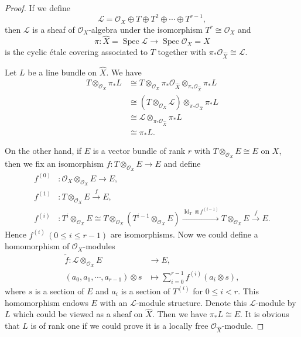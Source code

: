 \documentclass[12pt]{article}
\begin{document}
\begin{proof}
If we define
\[ \mathcal{L} = \mathcal{O}_{X} \oplus T \oplus T^{2} \oplus \cdots \oplus T^{r-1}, \]
then $\mathcal{L}$ is a sheaf of $\mathcal{O}_{X}$-algebra under the isomorphism $T^{r} \cong \mathcal{O}_{X}$ and
\[ \pi \colon \widehat{X} = \operatorname{Spec }\mathcal{L} \to \operatorname{Spec } \mathcal{O}_{X} = X \]
is the cyclic \'etale covering associated to $T$ together with $\pi_{*} \mathcal{O}_{\widehat{X}} \cong  \mathcal{L}$.

Let $L$ be a line bundle on $\widehat{X}$. We have
\begin{align*}
T \otimes_{\mathcal{O}_{X}} \pi_{*}L &\cong T \otimes_{\mathcal{O}_{X}} \pi_{*} \mathcal{O}_{\widehat{X}} \otimes_{\pi_{*} \mathcal{O}_{\widehat{X}}} \pi_{*}L \\
&\cong (T \otimes_{\mathcal{O}_{X}} \mathcal{L}) \otimes_{\pi_{*} \mathcal{O}_{\widehat{X}}} \pi_{*}L \\
&\cong \mathcal{L} \otimes_{\pi_{*} \mathcal{O}_{\widehat{X}}} \pi_{*}L \\
&\cong \pi_{*}L.
\end{align*}

On the other hand, if $E$ is a vector bundle of rank $r$ with $T \otimes_{\mathcal{O}_{X}} E \cong E$ on $X$, then we fix an isomorphism $f \colon T \otimes_{\mathcal{O}_{X}} E \to E$ and define
\begin{align*}
f^{(0)} &\colon \mathcal{O}_{X} \otimes_{\mathcal{O}_{X}} E \to E, \\
f^{(1)} &\colon T \otimes_{\mathcal{O}_{X}} E \xrightarrow{f} E, \\
f^{(i)} &\colon T^{i} \otimes_{\mathcal{O}_{X}} E \cong T \otimes_{\mathcal{O}_{X}} (T^{i-1} \otimes_{\mathcal{O}_{X}} E ) \xrightarrow{\operatorname{Id}_{T} \otimes f^{(i-1)}} T \otimes_{\mathcal{O}_{X}} E \xrightarrow{f} E.
\end{align*}
Hence $f^{(i)} \, (0 \leq i \leq r-1)$ are isomorphisms. Now we could define a homomorphism of $\mathcal{O}_{X}$-modules
\begin{align*}
\widetilde{f} \colon \mathcal{L} \otimes_{\mathcal{O}_{X}} E &\to E, \\
(a_{0}, a_{1}, \cdots, a_{r-1}) \otimes s &\mapsto \sum_{i=0}^{r-1} f^{(i)}(a_{i} \otimes s),
\end{align*}
where $s$ is a section of $E$ and $a_{i}$ is a section of $T^{(i)}$ for $0 \leq i < r$. This homomorphism endows $E$ with an $\mathcal{L}$-module structure. Denote this $\mathcal{L}$-module by $L$ which could be viewed as a sheaf on $\widehat{X}$. Then we have $\pi_{*}L \cong E$. It is obvious that $L$ is of rank one if we could prove it is a locally free $\mathcal{O}_{\widehat{X}}$-module.


\end{proof}
\end{document}
